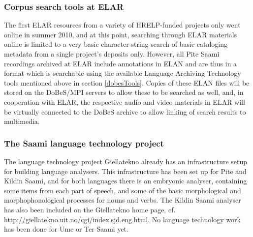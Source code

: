 \documentclass[a4paper,12pt]{article}
\begin{document}
\subsubsection{Corpus search tools at ELAR}%
The first ELAR resources from a variety of HRELP-funded projects only went online in summer 2010, and at this point, searching through ELAR materials online is limited to a very basic character-string search of basic cataloging metadata from a single project's deposits only. However, all Pite Saami recordings archived at ELAR include annotations in ELAN and are thus in a format which is searchable using the available Language Archiving Technology tools mentioned above in section \ref{dobesTools}. Copies of these ELAN files will be stored on the DoBeS/MPI servers to allow these to be searched as well, and, in cooperation with ELAR, the respective audio and video materials in ELAR will be virtually connected to the DoBeS archive to allow linking of search results to multimedia. %
%

\subsubsection{The Saami language technology project}%

The language technology project Giellatekno already has an infrastructure setup for building language analysers. This infrastructure has been set up for Pite and Kildin Saami, and for both languages there is an embryonic analyser, containing some items from each part of speech, and some of the basic morphological and morphophonological processes for nouns and verbs. The Kildin Saami analyser has also been included on the Giellatekno home page, cf. \url{http://giellatekno.uit.no/cgi/index.sjd.eng.html}.  No language technology work has been done for Ume or Ter Saami yet.
\end{document}
